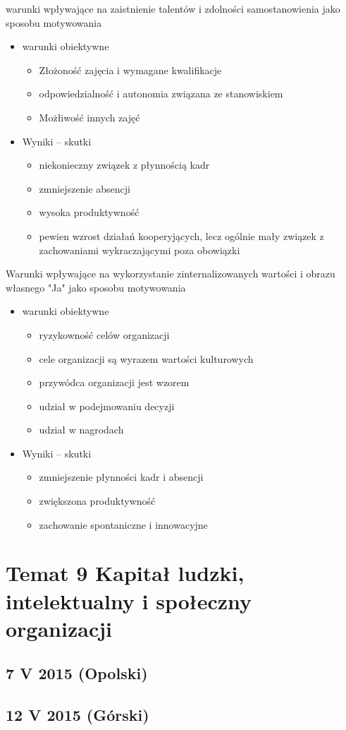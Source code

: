 \documentclass[a4paper,10pt]{report}
\begin{document}
\noindent warunki wpływające na zaistnienie talentów i zdolności samostanowienia jako sposobu motywowania
\begin{itemize}
	\item warunki obiektywne
	\begin{itemize}
		\item Złożoność zajęcia i wymagane kwalifikacje
		\item odpowiedzialność i autonomia związana ze stanowiskiem
		\item Możłiwość innych zajęć
	\end{itemize}
	\item Wyniki -- skutki
	\begin{itemize}
		\item niekonieczny związek z płynnością kadr
		\item zmniejszenie absencji
		\item wysoka produktywność
		\item pewien wzrost działań kooperyjących, lecz ogólnie mały związek z zachowaniami wykraczającymi poza obowiązki
	\end{itemize}	
\end{itemize}

\noindent Warunki wpływające na wykorzystanie zinternalizowanych wartości i obrazu własnego "Ja" jako sposobu motywowania
\begin{itemize}
	\item warunki obiektywne
	\begin{itemize}
		\item ryzykowność celów organizacji
		\item cele organizacji są wyrazem wartości kulturowych
		\item przywódca organizacji jest wzorem
		\item udział w podejmowaniu decyzji
		\item udział w nagrodach
	\end{itemize}
	\item Wyniki -- skutki
	\begin{itemize}
		\item zmniejszenie płynności kadr i absencji
		\item zwiększona produktywność
		\item zachowanie spontaniczne i innowacyjne
	\end{itemize}	
\end{itemize}

\chapter{Temat 9 Kapitał ludzki, intelektualny i społeczny organizacji}

\section{7 V 2015 (Opolski)}

\section{12 V 2015 (Górski) }

\medskip
	
\end{document}
